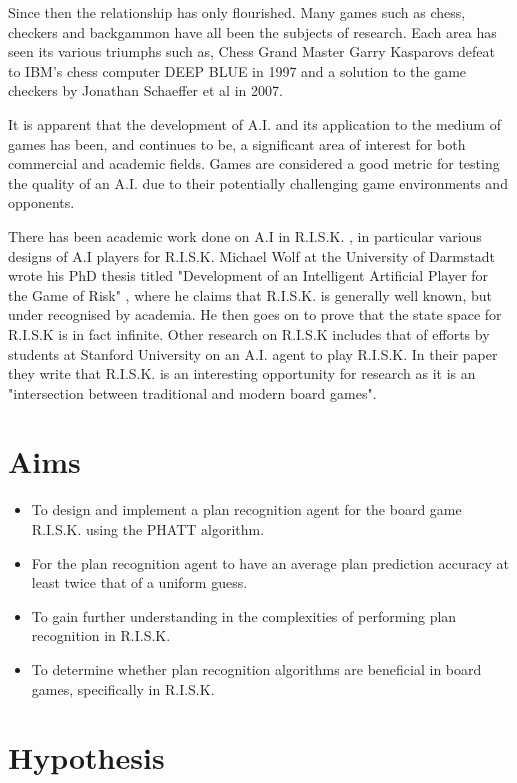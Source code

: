 \documentclass[parskip]{cs4rep}
\begin{document}
Since then the relationship has only flourished. Many games such as chess, checkers and backgammon have all been the subjects of research. Each area has seen its various triumphs such as, Chess Grand Master Garry Kasparovs defeat to IBM's chess computer DEEP BLUE in 1997 and a solution to the game checkers by Jonathan Schaeffer et al in 2007.

It is apparent that the development of A.I. and its application to the medium of games has been, and continues to be, a significant area of interest for both commercial and academic fields. Games are considered a good metric for testing the quality of an A.I. due to their potentially challenging game environments and opponents.

There has been academic work done on A.I in R.I.S.K. , in particular various designs of A.I players for R.I.S.K. Michael Wolf at the University of Darmstadt wrote his PhD thesis titled "Development of an Intelligent Artificial Player for the Game of Risk" \cite{michaelwolf}, where he claims that R.I.S.K. is generally well known, but under recognised by academia. He then goes on to prove that the state space for R.I.S.K is in fact infinite. Other research on R.I.S.K includes that of efforts by students at Stanford University on an A.I. agent \cite{jlozanodbratz} to play R.I.S.K. In their paper they write that R.I.S.K. is an interesting opportunity for research as it is an "intersection between traditional and modern board games".

\section{Aims}

\begin{itemize}
\item
To design and implement a plan recognition agent for the board game R.I.S.K. using the PHATT algorithm.
\item
For the plan recognition agent to have an average plan prediction accuracy at least twice that of a uniform guess.
\item
To gain further understanding in the complexities of performing plan recognition in R.I.S.K.
\item
To determine whether plan recognition algorithms are beneficial in board games, specifically in R.I.S.K.
\end{itemize}

\section{Hypothesis}
\end{document}
